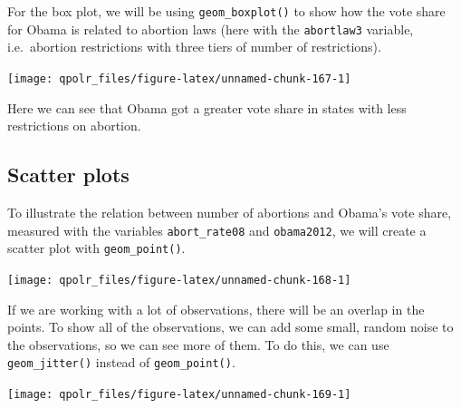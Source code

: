 \documentclass[12pt,oneside]{reedthesis}
\theoremstyle{definition}
\theoremstyle{definition}
\theoremstyle{definition}
\theoremstyle{remark}
\begin{document}
  For the box plot, we will be using \texttt{geom\_boxplot()} to show how
  the vote share for Obama is related to abortion laws (here with the
  \texttt{abortlaw3} variable, i.e.~abortion restrictions with three tiers
  of number of restrictions).
  \begin{Shaded}
  \begin{Highlighting}[]
  \NormalTok{(}\OperatorTok{+}
  \StringTok{  }\NormalTok{() }
  \end{Highlighting}
  \end{Shaded}
  \begin{center}\texttt{[image: qpolr\_files/figure-latex/unnamed-chunk-167-1]} \end{center}
  
  Here we can see that Obama got a greater vote share in states with less
  restrictions on abortion.
  
  \subsection{Scatter plots}\label{scatter-plots}
  
  To illustrate the relation between number of abortions and Obama's vote
  share, measured with the variables \texttt{abort\_rate08} and
  \texttt{obama2012}, we will create a scatter plot with
  \texttt{geom\_point()}.
  \begin{Shaded}
  \begin{Highlighting}[]
  \NormalTok{(}\OperatorTok{+}
  \StringTok{  }\NormalTok{() }
  \end{Highlighting}
  \end{Shaded}
  \begin{center}\texttt{[image: qpolr\_files/figure-latex/unnamed-chunk-168-1]} \end{center}
  
  If we are working with a lot of observations, there will be an overlap
  in the points. To show all of the observations, we can add some small,
  random noise to the observations, so we can see more of them. To do
  this, we can use \texttt{geom\_jitter()} instead of
  \texttt{geom\_point()}.
  \begin{Shaded}
  \begin{Highlighting}[]
  \NormalTok{(}\OperatorTok{+}
  \StringTok{  }\NormalTok{() }
  \end{Highlighting}
  \end{Shaded}
  \begin{center}\texttt{[image: qpolr\_files/figure-latex/unnamed-chunk-169-1]} \end{center}
  
\end{document}
